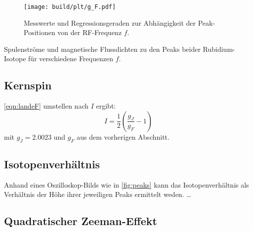 \begin{figure}
    \centering
    \texttt{[image: build/plt/g\_F.pdf]}
    \caption{Messwerte und Regressionsgeraden zur Abhängigkeit der Peak-Positionen von der RF-Frequenz $f$.}
    \label{fig:plt:g_F}
\end{figure}

\begin{table}
    \centering
    \caption{Spulenströme und magnetische Flussdichten zu den Peaks beider Rubidium-Isotope für verschiedene Frequenzen $f$.}
    \label{tab:mess}
\end{table}



\subsection{Kernspin}


\autoref{eqn:landeF} umstellen nach $I$ ergibt:
\[
    I = \frac{1}{2} \left( \frac{g_J}{g_F} - 1 \right)
\]
mit $g_J = \num{2.0023}$ und $g_F$ aus dem vorherigen Abschnitt.


\subsection{Isotopenverhältnis}
Anhand eines Oszilloskop-Bilds wie in \autoref{fig:peaks} kann das Isotopenverhältnis
als Verhältnis der Höhe ihrer jeweiligen Peaks ermittelt weden.
…


\subsection{Quadratischer Zeeman-Effekt}
